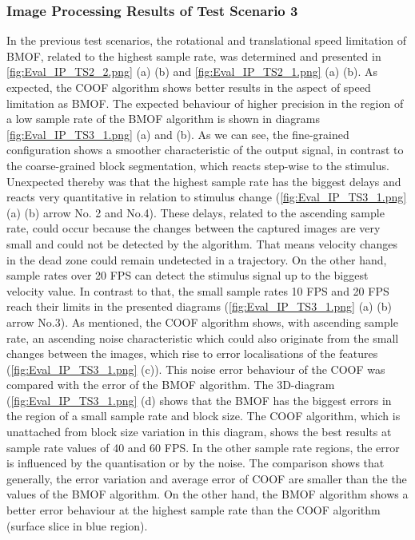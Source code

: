 \subsubsection{Image Processing Results of Test Scenario 3}
In the previous test scenarios, the rotational and translational speed limitation of \gls{BMOF}, related to the highest sample rate, was  determined and presented in \ref{fig:Eval_IP_TS2_2.png} (a) (b) and \ref{fig:Eval_IP_TS2_1.png} (a) (b). As expected, the \gls{COOF} algorithm shows better results in the aspect of speed limitation as \gls{BMOF}. The expected behaviour of higher precision in the region of a low sample rate of the \gls{BMOF} algorithm is shown in diagrams \ref{fig:Eval_IP_TS3_1.png} (a) and (b). As we can see, the fine-grained configuration shows a smoother characteristic of the output signal, in contrast to the coarse-grained block segmentation, which reacts step-wise to the stimulus. Unexpected thereby was that the highest sample rate has the biggest delays and reacts very quantitative in relation to stimulus change (\ref{fig:Eval_IP_TS3_1.png} (a) (b) arrow No. 2 and No.4). These delays, related to the ascending sample rate, could occur because the changes between the captured images are very small and could not be detected by the algorithm. That means velocity changes in the dead zone could remain undetected in a trajectory. On the other hand, sample rates over 20 \gls{FPS} can detect the stimulus signal up to the biggest velocity value. In contrast to that, the small sample rates 10 \gls{FPS} and 20 \gls{FPS} reach their limits in the presented diagrams 
(\ref{fig:Eval_IP_TS3_1.png} (a) (b) arrow No.3). As mentioned, the \gls{COOF} algorithm shows, with ascending sample rate, an ascending noise characteristic which could also originate from the small changes between the images, which rise to error localisations of the features (\ref{fig:Eval_IP_TS3_1.png} (c)). This noise error behaviour of the \gls{COOF} was compared with the error of the \gls{BMOF} algorithm. The 3D-diagram (\ref{fig:Eval_IP_TS3_1.png} (d) shows that the \gls{BMOF} has the biggest errors in the region of a small sample rate and block size. The \gls{COOF} algorithm, which is unattached from block size variation in this diagram, shows the best results at sample rate values of 40 and 60 \gls{FPS}. In the other sample rate regions, the error is influenced by the quantisation or by the noise. The comparison shows that generally, the error variation and average error of \gls{COOF} are smaller than the the values of the \gls{BMOF} algorithm. On the other hand, the \gls{BMOF} algorithm shows a better error behaviour at the highest sample rate than the \gls{COOF} algorithm (surface slice in blue region).
 
